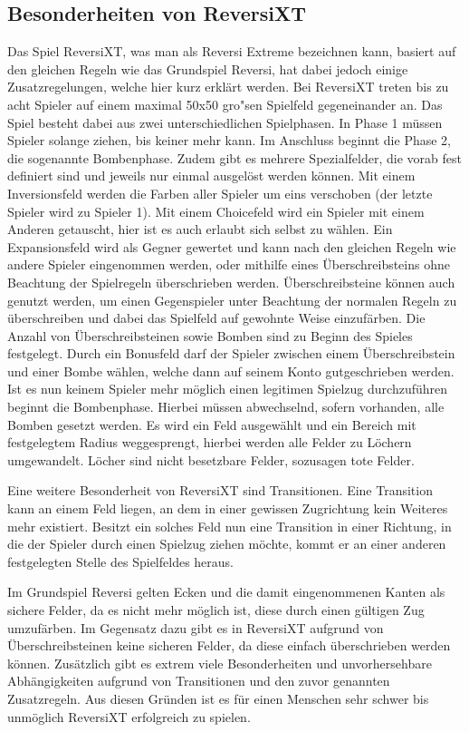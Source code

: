 \subsection{Besonderheiten von ReversiXT}\label{subsec:besonderheiten-von-reversixt}
Das Spiel ReversiXT, was man als Reversi Extreme bezeichnen kann, basiert auf den gleichen Regeln wie das Grundspiel Reversi, hat dabei jedoch einige Zusatzregelungen, welche hier kurz erkl\"art werden.
Bei ReversiXT treten bis zu acht Spieler auf einem maximal 50x50 gro"sen Spielfeld gegeneinander an.
Das Spiel besteht dabei aus zwei unterschiedlichen Spielphasen.
In Phase 1 m\"ussen Spieler solange ziehen, bis keiner mehr kann.
Im Anschluss beginnt die Phase 2, die sogenannte Bombenphase.
Zudem gibt es mehrere Spezialfelder, die vorab fest definiert sind und jeweils nur einmal ausgel\"ost werden k\"onnen.
Mit einem Inversionsfeld werden die Farben aller Spieler um eins verschoben (der letzte Spieler wird zu Spieler 1).
Mit einem Choicefeld wird ein Spieler mit einem Anderen getauscht, hier ist es auch erlaubt sich selbst zu w\"ahlen.
Ein Expansionsfeld wird als Gegner gewertet und kann nach den gleichen Regeln wie andere Spieler eingenommen werden, oder mithilfe eines \"Uberschreibsteins ohne Beachtung der Spielregeln \"uberschrieben werden.
\"Uberschreibsteine k\"onnen auch genutzt werden, um einen Gegenspieler unter Beachtung der normalen Regeln zu \"uberschreiben und dabei das Spielfeld auf gewohnte Weise einzuf\"arben.
Die Anzahl von \"Uberschreibsteinen sowie Bomben sind zu Beginn des Spieles festgelegt.
Durch ein Bonusfeld darf der Spieler zwischen einem \"Uberschreibstein und einer Bombe w\"ahlen, welche dann auf seinem Konto gutgeschrieben werden.
Ist es nun keinem Spieler mehr m\"oglich einen legitimen Spielzug durchzuf\"uhren beginnt die Bombenphase.
Hierbei m\"ussen abwechselnd, sofern vorhanden, alle Bomben gesetzt werden.
Es wird ein Feld ausgew\"ahlt und ein Bereich mit festgelegtem Radius weggesprengt, hierbei werden alle Felder zu L\"ochern umgewandelt.
L\"ocher sind nicht besetzbare Felder, sozusagen tote Felder.

Eine weitere Besonderheit von ReversiXT sind Transitionen.
Eine Transition kann an einem Feld liegen, an dem in einer gewissen Zugrichtung kein Weiteres mehr existiert.
Besitzt ein solches Feld nun eine Transition in einer Richtung, in die der Spieler durch einen Spielzug ziehen m\"ochte, kommt er an einer anderen festgelegten Stelle des Spielfeldes heraus.

Im Grundspiel Reversi gelten Ecken und die damit eingenommenen Kanten als sichere Felder, da es nicht mehr m\"oglich ist, diese durch einen g\"ultigen Zug umzuf\"arben.
Im Gegensatz dazu gibt es in ReversiXT aufgrund von \"Uberschreibsteinen keine sicheren Felder, da diese einfach \"uberschrieben werden k\"onnen.
Zus\"atzlich gibt es extrem viele Besonderheiten und unvorhersehbare Abh\"angigkeiten aufgrund von Transitionen und den zuvor genannten Zusatzregeln.
Aus diesen Gr\"unden ist es f\"ur einen Menschen sehr schwer bis unm\"oglich ReversiXT erfolgreich zu spielen.

